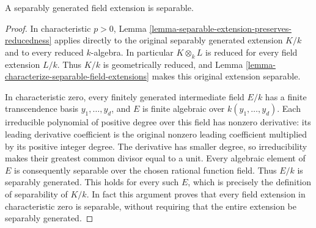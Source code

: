 \begin{lemma}
\label{lemma-separably-generated-separable}
A separably generated field extension is separable.
\end{lemma}

\begin{proof}
In characteristic $p>0$, Lemma
\ref{lemma-separable-extension-preserves-reducedness}
applies directly to the original separably generated
extension $K/k$ and to every reduced $k$-algebra.
In particular $K\otimes_k L$ is reduced for every
field extension $L/k$. Thus $K/k$ is geometrically
reduced, and Lemma
\ref{lemma-characterize-separable-field-extensions}
makes this original extension separable.

In characteristic zero, every finitely generated
intermediate field $E/k$ has a finite transcendence
basis $y_1,\ldots,y_d$, and $E$ is finite algebraic
over $k(y_1,\ldots,y_d)$. Each irreducible polynomial
of positive degree over this field has nonzero
derivative: its leading derivative coefficient is
the original nonzero leading coefficient multiplied
by its positive integer degree. The derivative has
smaller degree, so irreducibility makes their greatest
common divisor equal to a unit. Every algebraic
element of $E$ is consequently separable over the
chosen rational function field. Thus $E/k$ is
separably generated. This holds for every such $E$,
which is precisely the definition of separability
of $K/k$. In fact this argument proves that every
field extension in characteristic zero is separable,
without requiring that the entire extension be
separably generated.
\end{proof}